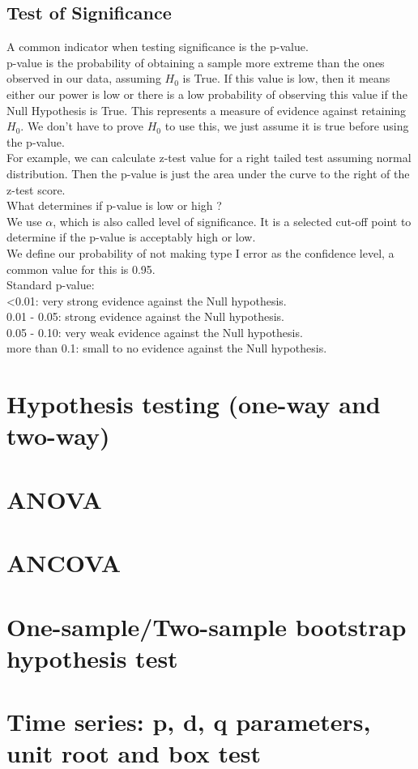 \subsection{Test of Significance}

A common indicator when testing significance is the p-value. \\

p-value is the probability of obtaining a sample more extreme than the ones observed in our data, assuming $H_0$ is True. If this value is low, then it means either our power is low or there is a low probability of observing this value if the Null Hypothesis is True. This represents a measure of evidence against retaining $H_0$. We don't have to prove $H_0$ to use this, we just assume it is true before using the p-value.\\

For example, we can calculate z-test value for a right tailed test assuming normal distribution. Then the p-value is just the area under the curve to the right of the z-test score.   \\

What determines if p-value is low or high ?\\
We use $\alpha$, which is also called level of significance. It is a selected cut-off point to determine if the p-value is acceptably high or low.\\

We define our probability of not making type I error as the confidence level, a common value for this is 0.95.\\

Standard p-value:\\
<0.01: very strong evidence against the Null hypothesis.\\
0.01 - 0.05: strong evidence against the Null hypothesis.\\
0.05 - 0.10: very weak evidence against the Null hypothesis. \\
more than 0.1: small to no evidence against the Null hypothesis. \\


\section{Hypothesis testing (one-way and two-way)}

\section{ANOVA}

\section{ANCOVA}

\section{One-sample/Two-sample bootstrap hypothesis test}

\section{Time series: p, d, q parameters, unit root and box test}



